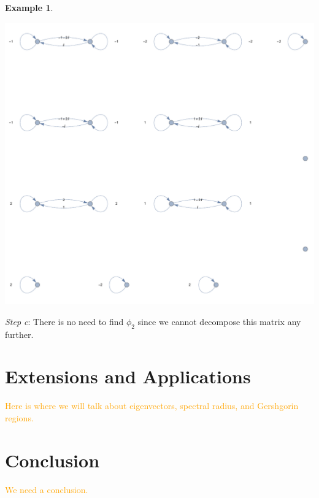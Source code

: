 \documentclass[preprint,12pt]{elsarticle}
\theoremstyle{definition}
\newtheorem{example}[thm]{Example}
\theoremstyle{remark}
\newcommand{\afcomm}[1]{\textcolor{orange}{#1}}
\renewcommand{\emph}{\textit}
\begin{document}
\begin{example}
\begin{center}
\includegraphics[scale=.5]{ex2_3.pdf}
\end{center}

\emph{Step c}: There is no need to find $\phi_2$ since we cannot decompose this matrix any further.

\end{example}
\section{Extensions and Applications}
\afcomm{Here is where we will talk about eigenvectors, spectral radius, and Gershgorin regions. }

\section{Conclusion}
\afcomm{We need a conclusion.}

{}
\end{document}
